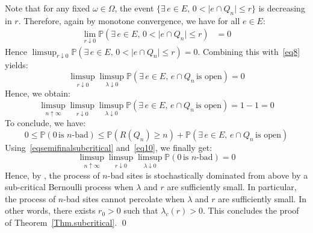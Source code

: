 \documentclass[10pt,a4paper]{amsart}
\theoremstyle{exampstyle}
\theoremstyle{exampnotations}
\begin{document}
Note that for any fixed $\omega \in \Omega$, the event $\lbrace \exists \, e \in E, \, 0 < \vert e \cap Q_n \vert \leq r \rbrace$ is decreasing in $r$. Therefore, again by monotone convergence, we have for all $e \in E$:
\begin{align*}
\lim_{r \downarrow 0} \mathbb{P}(\exists \, e \in E, \, 0 < \vert e \cap Q_n \vert \leq r) &= 0
\end{align*} 
Hence $\displaystyle \limsup_{r \downarrow 0} \mathbb{P}(\exists \, e \in E, \, 0 < \vert e \cap Q_n \vert \leq r) = 0$. Combining this with~\eqref{eq8} yields:
\begin{equation}
\label{eq9}
   \limsup_{r \downarrow 0}\limsup_{\lambda \downarrow 0} \mathbb{P}\left(\exists \, e \in E, \, e \cap Q_n \, \text{is open} \right) = 0
\end{equation}
Hence, we obtain:
\begin{equation}
    \label{eq10}
    \limsup_{n \uparrow \infty}\limsup_{r \downarrow 0}\limsup_{\lambda \downarrow 0} \mathbb{P}\left(\exists \, e \in E, \, e \cap Q_n \, \text{is open} \right) = 1-1 = 0
\end{equation}
To conclude, we have: 
\begin{equation*}
    0 \leq \mathbb{P}(0 \, \text{is $n$-bad}) \leq \mathbb{P}(R(Q_n) \geq n) + \mathbb{P}(\exists \, e \in E, \, e \cap Q_n \, \text{is open})
\end{equation*}
Using~\eqref{eqsemifinalsubcritical} and~\eqref{eq10}, we finally get:
\begin{equation*}
     \limsup_{n \uparrow \infty}\limsup_{r \downarrow 0}\limsup_{\lambda \downarrow 0} \mathbb{P}(0 \, \text{is $n$-bad}) =0
\end{equation*}
Hence, by \cite[Theorem 0.0]{liggett_domination_1997}, the process of $n$-bad sites is stochastically dominated from above by a sub-critical Bernoulli process when $\lambda$ and $r$ are sufficiently small. In particular, the process of $n$-bad sites cannot percolate when $\lambda$ and $r$ are sufficiently small. In other words, there exists $r_0 >0$ such that $\lambda_c(r) > 0$. This concludes the proof of Theorem~\ref{Thm.subcritical}. \qed
\end{document}
